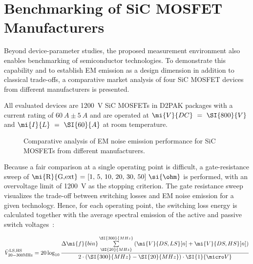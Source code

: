 
\section{Benchmarking of SiC MOSFET Manufacturers}

Beyond device-parameter studies, the proposed measurement environment also enables benchmarking of semiconductor technologies.
To demonstrate this capability and to establish EM emission as a design dimension in addition to classical trade-offs, a comparative market analysis of four SiC MOSFET devices from different manufacturers is presented.

All evaluated devices are \SI{1200}{V} SiC MOSFETs in D2PAK packages with a current rating of $\SI{60}{A}\pm\SI{5}{A}$ and are operated at $\mi{V}{DC}~=~\SI{800}{V}$ and $\mi{I}{L}~=~\SI{60}{A}$ at room temperature.

\begin{figure}[h]
	\centering
	
	\caption{Comparative analysis of EM noise emission performance for SiC MOSFETs from different manufacturers.}\label{fig:MR_CompetitorAnalysis}
\end{figure}

Because a fair comparison at a single operating point is difficult, a gate-resistance sweep of $\mbox{\mi{R}{G,ext} = [1, 5, 10, 20, 30, 50]~\si{\ohm}}$ is performed, with an overvoltage limit of \SI{1200}{V} as the stopping criterion.
The gate resistance sweep visualizes the trade-off between switching losses and EM noise emission for a given technology.
Hence, for each operating point, the switching loss energy  is calculated together with the average spectral emission of the active and passive switch voltages~\cite{kragl_impact_2024}:


\begin{equation}
	\bar{V}_\mathrm{20-300MHz}^\mathrm{LS,HS} = 20 \log_{10}\frac{\Delta\mi{f}{bin}\sum\limits_{\SI{20}{MHz}}^{\SI{300}{MHz}} \left(\mi{V}{DS,LS}[n] + \mi{V}{DS,HS}[n]\right)}{2\cdot(\SI{300}{MHz} - \SI{20}{MHz})\cdot\SI{1}{\micro V}}
\end{equation}


